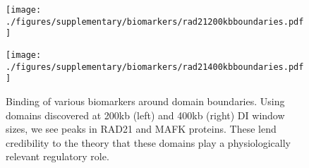 \begin{figure}[H]
  \begin{minipage}{0.5\textwidth}%
    \texttt{[image: ./figures/supplementary/biomarkers/rad21200kbboundaries.pdf]}
  \end{minipage}%
  \hfill
  \begin{minipage}{0.5\textwidth}
    \texttt{[image: ./figures/supplementary/biomarkers/rad21400kbboundaries.pdf]}
  \end{minipage}
  \medskip
  \small
  Binding of various biomarkers around domain boundaries.  Using domains discovered at 200kb (left) and 400kb (right)
  \gls{DI} window sizes, we see peaks in RAD21 and MAFK proteins.  These lend credibility to the theory that 
  these domains play a physiologically relevant regulatory role.
\end{figure}
